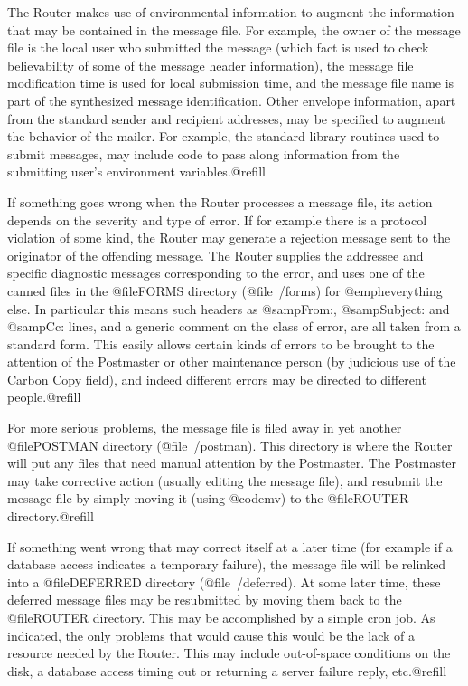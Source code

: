 The Router makes use of environmental information to augment the information
that may be contained in the message file. For example, the owner of the
message file is the local user who submitted the message (which fact is used
to check believability of some of the message header information), the
message file modification time is used for local submission time, and the
message file name is part of the synthesized message identification.  Other
envelope information, apart from the standard sender and recipient addresses,
may be specified to augment the behavior of the mailer.  For example, the
standard library routines used to submit messages, may include code to pass
along information from the submitting user's environment
variables.@refill

If something goes wrong when the Router processes a message file, its
action depends on the severity and type of error. If for example there
is a protocol violation of some kind, the Router may generate a
rejection message sent to the originator of the offending message. The
Router supplies the addressee and specific diagnostic messages
corresponding to the error, and uses one of the canned files in the
@file{FORMS} directory (@file{~/forms}) for @emph{everything else}.  In
particular this means such headers as @samp{From:}, @samp{Subject:} and
@samp{Cc:} lines, and a generic comment on the class of error, are all
taken from a standard form.  This easily allows certain kinds of errors
to be brought to the attention of the Postmaster or other maintenance
person (by judicious use of the Carbon Copy field), and indeed
different errors may be directed to different people.@refill

For more serious problems, the message file is filed away in yet
another @file{POSTMAN} directory (@file{~/postman}). This directory is
where the Router will put any files that need manual attention by the
Postmaster. The Postmaster may take corrective action (usually editing
the message file), and resubmit the message file by simply moving it
(using @code{mv}) to the @file{ROUTER} directory.@refill

If something went wrong that may correct itself at a later time (for example
if a database access indicates a temporary failure), the message file will be
relinked into a @file{DEFERRED} directory (@file{~/deferred}). At some later
time, these deferred message files may be resubmitted by moving them back
to the @file{ROUTER} directory. This may be accomplished by a simple cron job.
As indicated, the only problems that would cause this would be the lack of
a resource needed by the Router. This may include out-of-space conditions on
the disk, a database access timing out or returning a server failure reply,
etc.@refill

